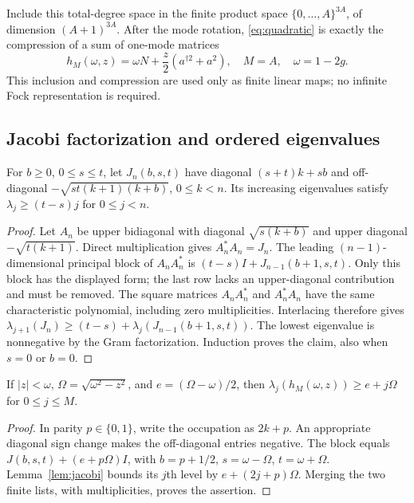 Include this total-degree space in the finite product space
$\{0,\ldots,A\}^{3A}$, of dimension $(A+1)^{3A}$. After the mode rotation,
\eqref{eq:quadratic} is exactly the compression of a sum of one-mode matrices
\begin{equation}\label{eq:oscillator}
 h_M(\omega,z)=\omega N+\frac z2(a^{\dagger2}+a^2),
 \quad M=A,\quad\omega=1-2g.
\end{equation}
This inclusion and compression are used only as finite linear maps; no infinite
Fock representation is required.

\subsection{Jacobi factorization and ordered eigenvalues}
\begin{lemma}\label{lem:jacobi}
For $b\ge0$, $0\le s\le t$, let $J_n(b,s,t)$ have diagonal
$(s+t)k+sb$ and off-diagonal $-\sqrt{st(k+1)(k+b)}$,
$0\le k<n$. Its increasing eigenvalues satisfy
$\lambda_j\ge(t-s)j$ for $0\le j<n$.
\end{lemma}
\begin{proof}
Let $A_n$ be upper bidiagonal with diagonal $\sqrt{s(k+b)}$ and upper diagonal
$-\sqrt{t(k+1)}$. Direct multiplication gives $A_n^*A_n=J_n$.
The leading $(n-1)$-dimensional principal block of $A_nA_n^*$ is
$(t-s)I+J_{n-1}(b+1,s,t)$. Only this block has the displayed form; the last
row lacks an upper-diagonal contribution and must be removed. The square
matrices $A_nA_n^*$ and $A_n^*A_n$ have the same characteristic polynomial,
including zero multiplicities. Interlacing therefore gives
$\lambda_{j+1}(J_n)\ge(t-s)+\lambda_j(J_{n-1}(b+1,s,t))$.
The lowest eigenvalue is nonnegative by the Gram factorization. Induction
proves the claim, also when $s=0$ or $b=0$.
\end{proof}

\begin{corollary}\label{cor:oscillator}
If $|z|<\omega$, $\Omega=\sqrt{\omega^2-z^2}$, and $e=(\Omega-\omega)/2$, then
$\lambda_j(h_M(\omega,z))\ge e+j\Omega$ for $0\le j\le M$.
\end{corollary}
\begin{proof}
In parity $p\in\{0,1\}$, write the occupation as $2k+p$.
An appropriate diagonal sign change makes the off-diagonal entries negative.
The block equals $J(b,s,t)+(e+p\Omega)I$, with
$b=p+1/2$, $s=\omega-\Omega$, $t=\omega+\Omega$.
Lemma~\ref{lem:jacobi} bounds its $j$th level by $e+(2j+p)\Omega$.
Merging the two finite lists, with multiplicities, proves the assertion.
\end{proof}

